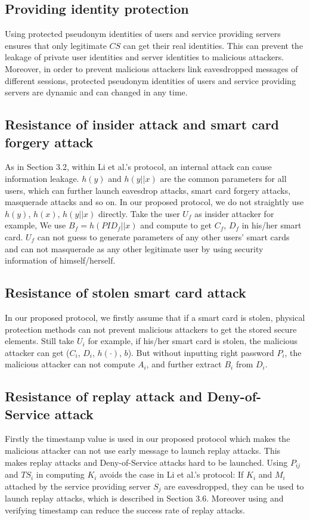 \documentclass[preprint,12pt]{elsarticle}
\begin{document}
\subsection{Providing identity protection}
Using protected pseudonym identities of users and service providing servers ensures that only legitimate $CS$ can get their real identities. This can prevent the leakage of private user identities and server identities to malicious attackers. Moreover, in order to prevent malicious attackers link eavesdropped messages of different sessions, protected pseudonym identities of users and service providing servers are dynamic and can changed in any time.

\subsection{Resistance of insider attack and smart card forgery attack}
As in Section 3.2, within Li et al.'s protocol, an internal attack can cause information leakage. $h(y)$ and $h(y||x)$ are the common parameters for all users, which can further launch eavesdrop attacks, smart card forgery attacks, masquerade attacks and so on. In our proposed protocol, we do not straightly use $h(y)$, $h(x)$, $h(y||x)$ directly. Take the user $U_f$ as insider attacker for example, We use $B_f=h(PID_f||x)$ and compute to get $C_f$, $D_f$ in his/her smart card. $U_f$ can not guess to generate parameters of any other users' smart cards and can not masquerade as any other legitimate user by using security information of himself/herself.

\subsection{Resistance of stolen smart card attack}
In our proposed protocol, we firstly assume that if a smart card is stolen, physical protection methods can not prevent malicious attackers to get the stored secure elements. Still take $U_i$ for example, if his/her smart card is stolen, the malicious attacker can get ($C_i$, $D_i$, $h(\cdot)$, $b$). But without inputting right password $P_i$, the malicious attacker can not compute $A_i$, and further extract $B_i$ from $D_i$.

\subsection{Resistance of replay attack and Deny-of-Service attack}
Firstly the timestamp value is used in our proposed protocol which makes the malicious attacker can not use early message to launch replay attacks. This makes replay attacks and Deny-of-Service attacks hard to be launched. Using $P_{ij}$ and $TS_i$ in computing $K_i$ avoids the case in Li et al.'s protocol: If $K_i$ and $M_i$ attached by the service providing server $S_j$ are eavesdropped, they can be used to launch replay attacks, which is described in Section 3.6. Moreover using and verifying timestamp can reduce the success rate of replay attacks.
\end{document}
